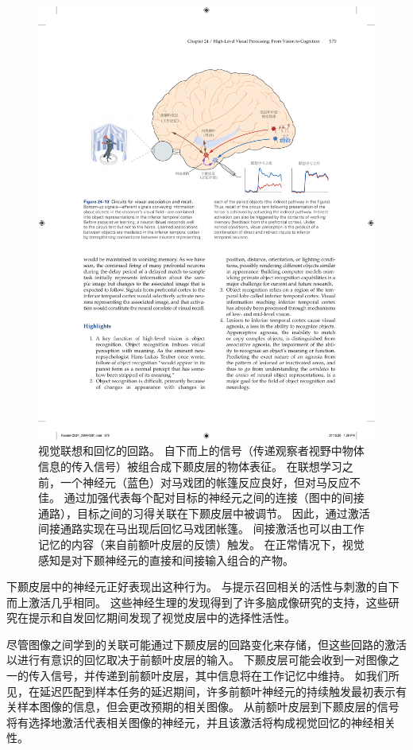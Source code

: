 \begin{figure}[htbp]
	\centering
	\includegraphics[width=1.0\linewidth]{chap24/fig_24_13}
	\caption{视觉联想和回忆的回路。
		自下而上的信号（传递观察者视野中物体信息的传入信号）被组合成下颞皮层的物体表征。
		在联想学习之前，一个神经元（蓝色）对马戏团的帐篷反应良好，但对马反应不佳。
		通过加强代表每个配对目标的神经元之间的连接（图中的间接通路），目标之间的习得关联在下颞皮层中被调节。
		因此，通过激活间接通路实现在马出现后回忆马戏团帐篷。
		间接激活也可以由工作记忆的内容（来自前额叶皮层的反馈）触发。
		在正常情况下，视觉感知是对下颞神经元的直接和间接输入组合的产物。}
	\label{fig:24_13}
\end{figure}


下颞皮层中的神经元正好表现出这种行为。
与提示召回相关的活性与刺激的自下而上激活几乎相同。
这些神经生理的发现得到了许多脑成像研究的支持，这些研究在提示和自发回忆期间发现了视觉皮层中的选择性活性。


尽管图像之间学到的关联可能通过下颞皮层的回路变化来存储，但这些回路的激活以进行有意识的回忆取决于前额叶皮层的输入。
下颞皮层可能会收到一对图像之一的传入信号，并传递到前额叶皮层，其中信息将在工作记忆中维持。
如我们所见，在延迟匹配到样本任务的延迟期间，许多前额叶神经元的持续触发最初表示有关样本图像的信息，但会更改预期的相关图像。
从前额叶皮层到下颞皮层的信号将有选择地激活代表相关图像的神经元，并且该激活将构成视觉回忆的神经相关性。




